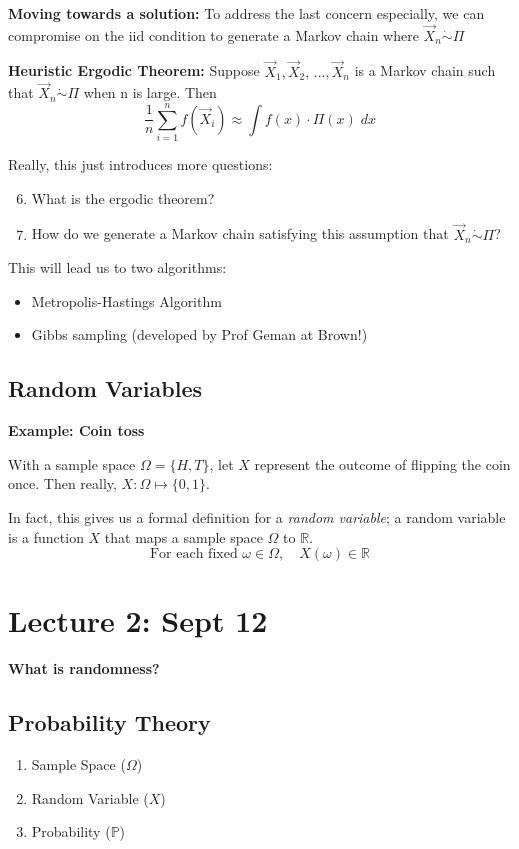 \documentclass[12pt]{article}
\renewcommand{\P}{\mathbb{P}}
\newcommand{\R}{\mathbb{R}}
\begin{document}
\textbf{Moving towards a solution:} To address the last concern especially, we can compromise on the iid condition to generate a Markov chain where $\vec{X}_n \dot \sim \Pi$

\textbf{Heuristic Ergodic Theorem:}
Suppose $\vec{X}_1, \vec{X}_2,\, ..., \vec{X}_n$ is a Markov chain such that $\vec{X}_n \dot \sim \Pi$ when n is large. Then 
\[\frac{1}{n} \sum_{i=1}^n f(\vec{X}_i) \approx \int f(x) \cdot \Pi(x)\; dx\]

Really, this just introduces more questions:
\begin{enumerate}
    \setcounter{enumi}{5}
    \item What is the ergodic theorem?
    \item How do we generate a Markov chain satisfying this assumption that $\vec{X}_n \dot \sim \Pi$?
\end{enumerate}

This will lead us to two algorithms:
\begin{itemize}
    \item Metropolis-Hastings Algorithm
    \item Gibbs sampling (developed by Prof Geman at Brown!)
\end{itemize}

\subsection{Random Variables}
\textbf{Example: Coin toss}

With a sample space $\Omega = \{H, T\}$, let $X$ represent the outcome of flipping the coin once. Then really, $X : \Omega \mapsto \{0, 1\}$.

In fact, this gives us a formal definition for a \emph{random variable}; a random variable is a function $X$ that maps a sample space $\Omega$ to $\R$.
\[\text{For each fixed } \omega \in \Omega, \quad X(\omega) \in \R\]

\section{Lecture 2: Sept 12}
\textbf{What is randomness?}

\subsection{Probability Theory}
\begin{enumerate}
    \item Sample Space ($\Omega$)
    \item Random Variable ($X$)
    \item Probability ($\P$)
\end{enumerate}
\end{document}
